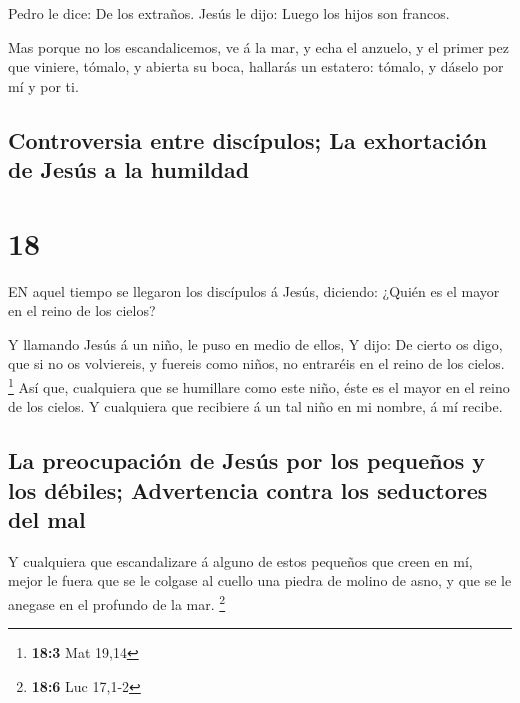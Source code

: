  Pedro le dice: De los extraños. Jesús le dijo: Luego los
hijos son francos.

 Mas porque no los escandalicemos, ve á la mar, y echa el
anzuelo, y el primer pez que viniere, tómalo, y abierta su boca,
hallarás un estatero: tómalo, y dáselo por mí y por ti.

\hypertarget{controversia-entre-discuxedpulos-la-exhortaciuxf3n-de-jesuxfas-a-la-humildad}{%
\subsection{Controversia entre discípulos; La exhortación de Jesús a la
humildad}\label{controversia-entre-discuxedpulos-la-exhortaciuxf3n-de-jesuxfas-a-la-humildad}}

\hypertarget{section-17}{%
\section{18}\label{section-17}}

 EN aquel tiempo se llegaron los discípulos á Jesús,
diciendo: ¿Quién es el mayor en el reino de los cielos?

 Y llamando Jesús á un niño, le puso en medio de ellos,
 Y dijo: De cierto os digo, que si no os volviereis, y
fuereis como niños, no entraréis en el reino de los cielos. \footnote{\textbf{18:3}
  Mat 19,14}  Así que, cualquiera que se humillare como este
niño, éste es el mayor en el reino de los cielos.  Y
cualquiera que recibiere á un tal niño en mi nombre, á mí recibe.

\hypertarget{la-preocupaciuxf3n-de-jesuxfas-por-los-pequeuxf1os-y-los-duxe9biles-advertencia-contra-los-seductores-del-mal}{%
\subsection{La preocupación de Jesús por los pequeños y los débiles;
Advertencia contra los seductores del
mal}\label{la-preocupaciuxf3n-de-jesuxfas-por-los-pequeuxf1os-y-los-duxe9biles-advertencia-contra-los-seductores-del-mal}}

 Y cualquiera que escandalizare á alguno de estos pequeños
que creen en mí, mejor le fuera que se le colgase al cuello una piedra
de molino de asno, y que se le anegase en el profundo de la mar.
\footnote{\textbf{18:6} Luc 17,1-2}

